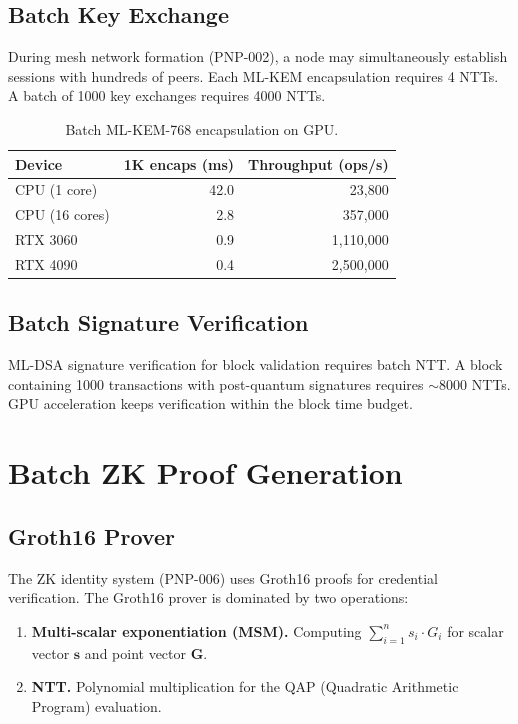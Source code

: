 \documentclass[11pt,a4paper]{article}
\begin{document}
\subsection{Batch Key Exchange}

During mesh network formation (PNP-002), a node may simultaneously
establish sessions with hundreds of peers.  Each ML-KEM encapsulation
requires 4 NTTs.  A batch of 1000 key exchanges requires 4000 NTTs.

\begin{table}[h]
\centering
\caption{Batch ML-KEM-768 encapsulation on GPU.}
\label{tab:mlkem_gpu}
\begin{tabular}{@{}lrr@{}}
\toprule
\textbf{Device} & \textbf{1K encaps (ms)} & \textbf{Throughput (ops/s)} \\
\midrule
CPU (1 core)  & 42.0 & 23{,}800 \\
CPU (16 cores) & 2.8 & 357{,}000 \\
RTX 3060      & 0.9  & 1{,}110{,}000 \\
RTX 4090      & 0.4  & 2{,}500{,}000 \\
\bottomrule
\end{tabular}
\end{table}

\subsection{Batch Signature Verification}

ML-DSA signature verification for block validation requires batch NTT.
A block containing 1000 transactions with post-quantum signatures
requires $\sim$8000 NTTs.  GPU acceleration keeps verification within
the block time budget.

\section{Batch ZK Proof Generation}
\label{sec:zk_gpu}

\subsection{Groth16 Prover}

The ZK identity system (PNP-006) uses Groth16 proofs for
credential verification.  The Groth16 prover is dominated by two
operations:

\begin{enumerate}
    \item \textbf{Multi-scalar exponentiation (MSM).}  Computing
    $\sum_{i=1}^{n} s_i \cdot G_i$ for scalar vector $\mathbf{s}$ and
    point vector $\mathbf{G}$.
    \item \textbf{NTT.}  Polynomial multiplication for the QAP
    (Quadratic Arithmetic Program) evaluation.
\end{enumerate}
\end{document}
